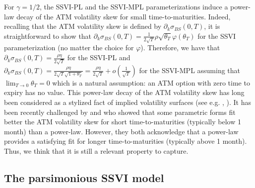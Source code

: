 \begin{remark}\label{rk:atm_skew}
    For $\gamma =1/2$, the SSVI-PL and the SSVI-MPL parameterizations induce a power-law decay of the ATM volatility skew for small time-to-maturities. Indeed, recalling that the ATM volatility skew is defined by $\partial_k \sigma_{BS}(0,T)$, it is straightforward to show that $\partial_k \sigma_{BS}(0,T)=\frac{1}{2\sqrt{T}}\rho\sqrt{\theta_T}\varphi(\theta_T)$ for the SSVI parameterization (no matter the choice for $\varphi$). Therefore, we have that $\partial_k \sigma_{BS}(0,T) = \frac{\rho \eta}{2\sqrt{T}}$ for the SSVI-PL and $\partial_k \sigma_{BS}(0,T) = \frac{\rho \eta}{2\sqrt{T}\sqrt{1+\theta_T}} = \frac{\rho \eta}{2\sqrt{T}} + o\left(\frac{1}{\sqrt{T}}\right)$ for the SSVI-MPL assuming that $\lim_{T\to 0}\theta_T = 0$ which is a natural assumption: an ATM option with zero time to expiry has no value. This power-law decay of the ATM volatility skew has long been considered as a stylized fact of implied volatility surfaces (see e.g. \citeauthor{gatheral2018volatility}, \citeyear{gatheral2018volatility}). It has been recently challenged by \cite{guyon2023does} and \cite{delemotte2023yet} who showed that some parametric forms fit better the ATM volatility skew for short time-to-maturities (typically below 1 month) than a power-law. However, they both acknowledge that a power-law provides a satisfying fit for longer time-to-maturities (typically above 1 month). Thus, we think that it is still a relevant property to capture. 
\end{remark}

\subsection{The parsimonious SSVI model}\label{sec:pssvi}





